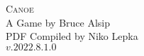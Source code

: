 



\begin{center}
    \Huge \textsc{Canoe}\\
    \LARGE A Game by Bruce Alsip\\
    \large PDF Compiled by Niko Lepka\\
    $v.2022.8.1.0$
\end{center}









